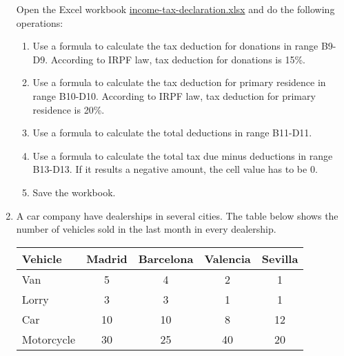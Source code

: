 \begin{enumerate}[leftmargin=*,resume]
Open the Excel workbook
\href{http://aprendeconalf.es/office/excel/exercises/formulas/income-tax-declaration.xlsx}{\textsf{income-tax-declaration.xlsx}}
and do the following operations:

\begin{enumerate}
\item Use a formula to calculate the tax deduction for donations in range B9-D9. According to IRPF law, tax deduction
for donations is 15\%.
\item Use a formula to calculate the tax deduction for primary residence in range B10-D10. According to IRPF law, tax deduction
for primary residence is 20\%.
\item Use a formula to calculate the total deductions in range B11-D11. 
\item Use a formula to calculate the total tax due minus deductions in range B13-D13. If it results a negative amount,
the cell value has to be 0. 
\item Save the workbook. 
\end{enumerate}


\item \label{ex-car-dealerships}A car company have dealerships in several cities. The table below shows the number of
vehicles sold in the last month in every dealership. 
\begin{center}
\begin{tabular}{lcccc}
\toprule
Vehicle & Madrid & Barcelona & Valencia & Sevilla\\
\midrule
Van & 5 & 4 & 2 & 1\\
Lorry & 3 & 3 & 1 & 1\\
Car & 10 & 10 & 8 & 12\\
Motorcycle & 30 & 25 & 40 & 20\\
\bottomrule
\end{tabular}
\end{center}


\end{enumerate}
